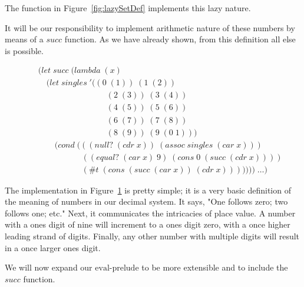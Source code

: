 The function in Figure~\ref{fig:lazySetDef} implements this lazy nature.

It will be our responsibility to implement arithmetic nature of these numbers 
by means of a $succ$ function. As we have already shown, from this definition 
all else is possible.

\begin{figure}[htp]
\footnotesize
\caption{}\label{fig:succDef}
\begin{align*}
& (let \; succ \; (lambda \; (x)
\\& \quad (let \; singles \; '((0 \; (1)) \; (1 \; (2)) \; 
\\& \qquad \qquad \qquad \qquad \; (2 \; (3)) \; (3 \; (4)) \; 
\\& \qquad \qquad \qquad \qquad \; (4 \; (5)) \; (5 \; (6)) \; 
\\& \qquad \qquad \qquad \qquad \; (6 \; (7)) \; (7 \; (8)) \; 
\\& \qquad \qquad \qquad \qquad \; (8 \; (9)) \; (9 \; (0 \; 1)))
\\& \qquad (cond \; (((null? \; (cdr \; x)) \; (assoc \; singles \; (car \; x)))
\\& \qquad \qquad \quad \; ((equal? \; (car \; x) \; 9) \; (cons \; 0 \; (succ \; (cdr \; x))))
\\& \qquad \qquad \quad \; (\#t \; (cons \; (succ \; (car \; x)) \; (cdr \; x))))))) \; \dots)
\end{align*}
\end{figure}

The implementation in Figure~\ref{fig:succDef} is pretty simple; it is a very
basic definition of the meaning of numbers in our decimal system. It says, "One
follows zero; two follows one; etc." Next, it communicates the intricacies of
place value. A number with a ones digit of nine will increment to a ones digit
zero, with a once higher leading strand of digits. Finally, any other number
with multiple digits will result in a once larger ones digit.

We will now expand our $\text{eval-prelude}$ to be more extensible and to include 
the $succ$ function.

